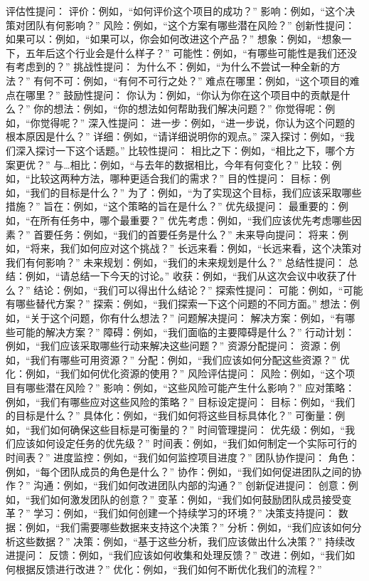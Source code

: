 \documentclass[12pt]{book}
\begin{document}
评估性提问：
评价：例如，“如何评价这个项目的成功？”
影响：例如，“这个决策对团队有何影响？”
风险：例如，“这个方案有哪些潜在风险？”
创新性提问：
如果可以：例如，“如果可以，你会如何改进这个产品？”
想象：例如，“想象一下，五年后这个行业会是什么样子？”
可能性：例如，“有哪些可能性是我们还没有考虑到的？”
挑战性提问：
为什么不：例如，“为什么不尝试一种全新的方法？”
有何不可：例如，“有何不可行之处？”
难点在哪里：例如，“这个项目的难点在哪里？”
鼓励性提问：
你认为：例如，“你认为你在这个项目中的贡献是什么？”
你的想法：例如，“你的想法如何帮助我们解决问题？”
你觉得呢：例如，“你觉得呢？”
深入性提问：
进一步：例如，“进一步说，你认为这个问题的根本原因是什么？”
详细：例如，“请详细说明你的观点。”
深入探讨：例如，“我们深入探讨一下这个话题。”
比较性提问：
相比之下：例如，“相比之下，哪个方案更优？”
与…相比：例如，“与去年的数据相比，今年有何变化？”
比较：例如，“比较这两种方法，哪种更适合我们的需求？”
目的性提问：
目标：例如，“我们的目标是什么？”
为了：例如，“为了实现这个目标，我们应该采取哪些措施？”
旨在：例如，“这个策略的旨在是什么？”
优先级提问：
最重要的：例如，“在所有任务中，哪个最重要？”
优先考虑：例如，“我们应该优先考虑哪些因素？”
首要任务：例如，“我们的首要任务是什么？”
未来导向提问：
将来：例如，“将来，我们如何应对这个挑战？”
长远来看：例如，“长远来看，这个决策对我们有何影响？”
未来规划：例如，“我们的未来规划是什么？”
总结性提问：
总结：例如，“请总结一下今天的讨论。”
收获：例如，“我们从这次会议中收获了什么？”
结论：例如，“我们可以得出什么结论？”
探索性提问：
可能：例如，“可能有哪些替代方案？”
探索：例如，“我们探索一下这个问题的不同方面。”
想法：例如，“关于这个问题，你有什么想法？”
问题解决提问：
解决方案：例如，“有哪些可能的解决方案？”
障碍：例如，“我们面临的主要障碍是什么？”
行动计划：例如，“我们应该采取哪些行动来解决这些问题？”
资源分配提问：
资源：例如，“我们有哪些可用资源？”
分配：例如，“我们应该如何分配这些资源？”
优化：例如，“我们如何优化资源的使用？”
风险评估提问：
风险：例如，“这个项目有哪些潜在风险？”
影响：例如，“这些风险可能产生什么影响？”
应对策略：例如，“我们有哪些应对这些风险的策略？”
目标设定提问：
目标：例如，“我们的目标是什么？”
具体化：例如，“我们如何将这些目标具体化？”
可衡量：例如，“我们如何确保这些目标是可衡量的？”
时间管理提问：
优先级：例如，“我们应该如何设定任务的优先级？”
时间表：例如，“我们如何制定一个实际可行的时间表？”
进度监控：例如，“我们如何监控项目进度？”
团队协作提问：
角色：例如，“每个团队成员的角色是什么？”
协作：例如，“我们如何促进团队之间的协作？”
沟通：例如，“我们如何改进团队内部的沟通？”
创新促进提问：
创意：例如，“我们如何激发团队的创意？”
变革：例如，“我们如何鼓励团队成员接受变革？”
学习：例如，“我们如何创建一个持续学习的环境？”
决策支持提问：
数据：例如，“我们需要哪些数据来支持这个决策？”
分析：例如，“我们应该如何分析这些数据？”
决策：例如，“基于这些分析，我们应该做出什么决策？”
持续改进提问：
反馈：例如，“我们应该如何收集和处理反馈？”
改进：例如，“我们如何根据反馈进行改进？”
优化：例如，“我们如何不断优化我们的流程？”
\end{document}
